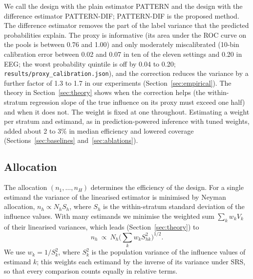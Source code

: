 \documentclass[pdflatex,sn-mathphys-num,iicol]{sn-jnl}
\theoremstyle{thmstyleone}
\theoremstyle{thmstyletwo}
\theoremstyle{thmstylethree}
\begin{document}
We call the design with the plain estimator PATTERN and the design with the difference estimator PATTERN-DIF; PATTERN-DIF is the proposed method. The difference estimator removes the part of the label variance that the predicted probabilities explain. The proxy is informative (its area under the ROC curve on the pools is between 0.76 and 1.00) and only moderately miscalibrated (10-bin calibration error between 0.02 and 0.07 in ten of the eleven settings and 0.20 in EEG; the worst probability quintile is off by 0.04 to 0.20; \texttt{results/proxy\_calibration.json}), and the correction reduces the variance by a further factor of 1.3 to 1.7 in our experiments (Section~\ref{sec:empirical}). The theory in Section~\ref{sec:theory} shows when the correction helps (the within-stratum regression slope of the true influence on its proxy must exceed one half) and when it does not. The weight is fixed at one throughout. Estimating a weight per stratum and estimand, as in prediction-powered inference with tuned weights, added about 2 to 3\% in median efficiency and lowered coverage (Sections~\ref{sec:baselines} and~\ref{sec:ablations}).

\subsection{Allocation}
The allocation $(n_1,\dots,n_H)$ determines the efficiency of the design. For a single estimand the variance of the linearised estimator is minimised by Neyman allocation, $n_h\propto N_h S_h$, where $S_h$ is the within-stratum standard deviation of the influence values. With many estimands we minimise the weighted sum $\sum_k w_k V_k$ of their linearised variances, which leads (Section~\ref{sec:theory}) to
\begin{equation}\label{eq:alloc}
n_h\ \propto\ N_h\Big(\sum_k w_k S^2_{hk}\Big)^{1/2}.
\end{equation}
We use $w_k=1/S_k^2$, where $S_k^2$ is the population variance of the influence values of estimand $k$; this weights each estimand by the inverse of its variance under SRS, so that every comparison counts equally in relative terms.
\end{document}
